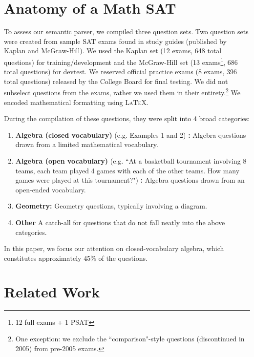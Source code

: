 \documentclass[11pt,letterpaper]{article}
\begin{document}
\section{Anatomy of a Math SAT}

To assess our semantic parser, we compiled three question sets. Two question sets were created from sample SAT exams found in study guides (published by Kaplan and McGraw-Hill). We used the Kaplan set (12 exams, 648 total questions) for training/development and the McGraw-Hill set (13 exams\footnote{12 full exams + 1 PSAT}, 686 total questions) for devtest. We reserved official practice exams (8 exams, 396 total questions) released by the College Board for final testing. We did not subselect questions from the exams, rather we used them in their entirety.\footnote{One exception: we exclude the ``comparison"-style questions (discontinued in 2005) from pre-2005 exams.} We encoded mathematical formatting using \textsc{LaTeX}.

During the compilation of these questions, they were split into 4 broad categories:


\begin{enumerate}
\item
\textbf{Algebra (closed vocabulary)} (e.g. Examples 1 and 2) \textbf{: } Algebra questions drawn from a limited mathematical vocabulary.
\item
\textbf{Algebra (open vocabulary)} (e.g. ``At a basketball tournament involving 8 teams, each team played 4 games with each of the other teams. How many games were played at this tournament?") \textbf{: } Algebra questions drawn from an open-ended vocabulary.
\item
\textbf{Geometry:} Geometry questions, typically involving a diagram.
\item
\textbf{Other} A catch-all for questions that do not fall neatly into the above categories.
\end{enumerate}

\noindent In this paper, we focus our attention on closed-vocabulary algebra, which constitutes approximately 45\% of the questions.


\section{Related Work}
\end{document}
